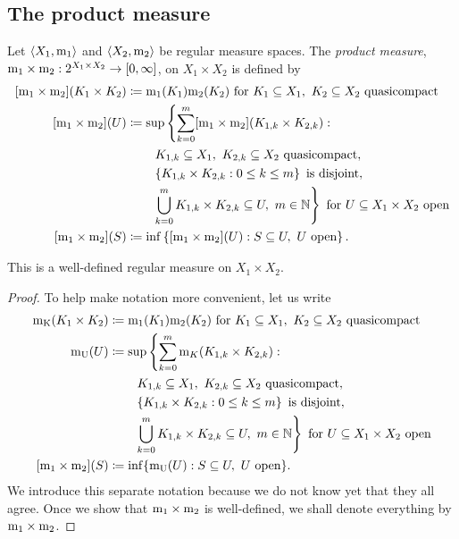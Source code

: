 \subsection{The product measure}

\begin{dfn}
Let $\langle X_1,\mathrm{m} _1\rangle$ and $\langle X_2,\mathrm{m} _2\rangle$ be regular measure spaces.  The \emph{product measure}, $\mathrm{m} _1\times \mathrm{m} _2:2^{X_1\times X_2}\rightarrow [0,\infty ]$, on $X_1\times X_2$ is defined by
\begin{equation}
\begin{split}
[\meas _1\times \meas _2](K_1\times K_2) & \coloneqq \meas _1(K_1)\meas _2(K_2)\text{ for }K_1\subseteq X_1,\ K_2\subseteq X_2\text{ quasicompact} \\
[\meas _1\times \meas _2](U) & \coloneqq \sup \left\{ \sum _{k=0}^m[\meas _1\times \meas _2](K_{1,k}\times K_{2,k}):\right. \\
& \qquad \left. K_{1,k}\subseteq X_1,\ K_{2,k}\subseteq X_2\text{ quasicompact},\right. \\
& \qquad \left. \left\{ K_{1,k}\times K_{2,k}:0\leq k\leq m\right\} \text{ is disjoint},\right. \\
& \qquad \left. \bigcup _{k=0}^mK_{1,k}\times K_{2,k}\subseteq U,\ m\in \N \right\} \text{ for }U\subseteq X_1\times X_2\text{ open} \\
[\meas _1\times \meas _2](S) & \coloneqq \inf \left\{ [\meas _1\times \meas _2](U):S\subseteq U,\ U\text{ open}\right\} .
\end{split}
\end{equation}
\begin{prp}
\begin{savenotes}
This is a well-defined regular measure on $X_1\times X_2$.
\begin{proof}
To help make notation more convenient, let us write
\begin{equation}
\begin{split}
\meas _{\mathrm{K}}(K_1\times K_2) & \coloneqq \meas _1(K_1)\meas _2(K_2)\text{ for }K_1\subseteq X_1,\ K_2\subseteq X_2\text{ quasicompact} \\
\meas _{\mathrm{U}}(U) & \coloneqq \sup \left\{ \sum _{k=0}^m\meas _K(K_{1,k}\times K_{2,k}):\right. \\
& \qquad \left. K_{1,k}\subseteq X_1,\ K_{2,k}\subseteq X_2\text{ quasicompact},\right. \\
& \qquad \left. \left\{ K_{1,k}\times K_{2,k}:0\leq k\leq m\right\} \text{ is disjoint},\right. \\
& \qquad \left. \bigcup _{k=0}^mK_{1,k}\times K_{2,k}\subseteq U,\ m\in \N \right\} \text{ for }U\subseteq X_1\times X_2\text{ open} \\
[\meas _1\times \meas _2](S) & \coloneqq \inf \{ \meas _{\mathrm{U}}(U):S\subseteq U,\ U\text{ open}\} .
\end{split}
\end{equation}
We introduce this separate notation because we do not know yet that they all agree.  Once we show that $\mathrm{m} _1\times \mathrm{m} _2$ is well-defined, we shall denote everything by $\mathrm{m} _1\times \mathrm{m} _2$.


\end{proof}
\end{savenotes}
\end{prp}
\end{dfn}
